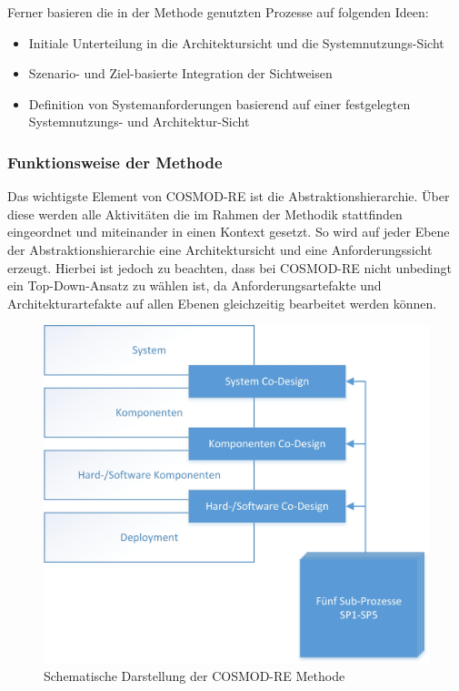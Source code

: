 Ferner basieren die in der Methode genutzten Prozesse auf folgenden Ideen: \cite{Poh01} \\

\begin{itemize}
\item Initiale Unterteilung in die Architektursicht und die Systemnutzungs-Sicht
\item Szenario- und Ziel-basierte Integration der Sichtweisen
\item Definition von Systemanforderungen basierend auf einer festgelegten Systemnutzungs- und Architektur-Sicht \\
\end{itemize}

\subsubsection{Funktionsweise der Methode}
Das wichtigste Element von COSMOD-RE ist die Abstraktionshierarchie. \"Uber diese werden alle Aktivit\"aten die im Rahmen der Methodik stattfinden eingeordnet und miteinander in einen Kontext gesetzt. So wird auf jeder Ebene der Abstraktionshierarchie eine Architektursicht und eine Anforderungssicht erzeugt. Hierbei ist jedoch zu beachten, dass bei COSMOD-RE nicht unbedingt ein Top-Down-Ansatz zu w\"ahlen ist, da Anforderungsartefakte und Architekturartefakte auf allen Ebenen gleichzeitig bearbeitet werden k\"onnen.\\

\begin{figure}[h]
	\centering
	\includegraphics[scale=0.75]{COSMODREoverview.jpg} 
	\caption{Schematische Darstellung der COSMOD-RE Methode}\label{cosmodreow}
\end{figure}

